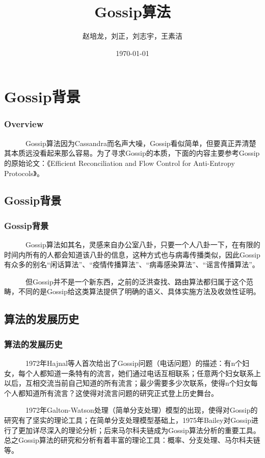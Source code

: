 \documentclass[slidestop,compress,mathserif,c]{beamer}
\title{Gossip算法}
\author{赵培龙，刘正，刘志宇，王素洁}
\date{\today}
\institute{同济大学电信学院}
\begin{document}
\frame{\titlepage}

\section{Gossip背景}

\begin{frame}
\frametitle{Overview}
~~~~~~Gossip算法因为Cassandra而名声大噪，Gossip看似简单，但要真正弄清楚其本质远没看起来那么容易。为了寻求Gossip的本质，下面的内容主要参考Gossip的原始论文：《Efficient Reconciliation and Flow Control for Anti-Entropy Protocols》。
\end{frame}

\subsection{\hfill  Gossip背景}
\begin{frame}
\frametitle{Gossip背景}
~~~~~~Gossip算法如其名，灵感来自办公室八卦，只要一个人八卦一下，在有限的时间内所有的人都会知道该八卦的信息，这种方式也与病毒传播类似，因此Gossip有众多的别名“闲话算法”、“疫情传播算法”、“病毒感染算法”、“谣言传播算法”。

~~~~~~但Gossip并不是一个新东西，之前的泛洪查找、路由算法都归属于这个范畴，不同的是Gossip给这类算法提供了明确的语义、具体实施方法及收敛性证明。
\end{frame}


\subsection{\hfill 算法的发展历史}
\begin{frame}
\frametitle{算法的发展历史}
~~~~~~1972年Hajnal等人首次给出了Gossip问题（电话问题）的描述：有n个妇女，每个人都知道一条特有的流言，她们通过电话互相联系；任意两个妇女联系上以后，互相交流当前自己知道的所有流言；最少需要多少次联系，使得n个妇女每个人都知道所有流言？这使得对流言问题的研究正式登上历史舞台。
 
~~~~~~1972年Galton-Watson处理（简单分支处理）模型的出现，使得对Gossip的研究有了坚实的理论工具；在简单分支处理模型基础上，1975年Bailey对Gossip进行了更加详尽深入的理论分析；后来马尔科夫链成为Gossip算法分析的重要工具。总之Gossip算法的研究和分析有着丰富的理论工具：概率、分支处理、马尔科夫链等。
\end{frame}
\end{document}
